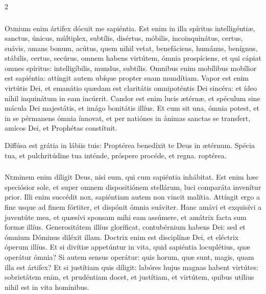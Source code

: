\documentclass[9pt,twoside]{extarticle}
\begin{document}
\begin{multicols}{2}
\subsubsection*{\center {}}
\lettrine{O}mnium enim ártifex dócuit me sapiéntia. Est enim in illa spíritus intelligéntiæ, sanctus, únicus, múltiplex, subtílis, disértus, móbilis, incoinquinátus, certus, suávis, amans bonum, acútus, quem nihil vetat, benefáciens, humánus, benígnus, stábilis, certus, secúrus, omnem habens virtútem, ómnia prospíciens, et qui cápiat omnes spíritus: intelligíbilis, mundus, subtílis. Omnibus enim mobílibus mobílior est sapiéntia: attíngit autem ubíque propter suam mundítiam. Vapor est enim virtútis Dei, et emanátio quædam est claritátis omnipoténtis Dei sincéra: et ídeo nihil inquinátum in eam incúrrit. Candor est enim lucis ætérnæ, et spéculum sine mácula Dei majestátis, et imágo bonitátis illíus. Et cum sit una, ómnia potest, et in se pérmanens ómnia ínnovat, et per natiónes in ánimas sanctas se transfert, amícos Dei, et Prophétas constítuit.

\begin{tightlist}{}
\item {} Diffúsa est grátia in lábiis tuis: \textred{*} Proptérea benedíxit te Deus in ætérnum.  Spécia tua, et pulchritúdine tua inténde, próspere procéde, et regna. roptérea.
\end{tightlist}

\subsubsection*{\center {}}
\lettrine{N}eminem enim díligit Deus, nisi eum, qui cum sapiéntia inhábitat. Est enim hæc speciósior sole, et super omnem dispositiónem stellárum, luci comparáta invenítur prior. Illi enim succédit nox, sapiéntiam autem non vincit malítia. Attíngit ergo a fine usque ad finem fórtiter, et dispónit ómnia suáviter. Hanc amávi et exquisívi a juventúte mea, et quæsívi sponsam mihi eam assúmere, et amátrix facta sum formæ illíus. Generositátem illíus gloríficat, contubérnium habens Dei: sed et ómnium Dóminus diléxit illam. Doctrix enim est disciplínæ Dei, et eléctrix óperum illíus. Et si divítiæ appetúntur in vita, quid sapiéntia locuplétius, quæ operátur ómnia? Si autem sensus operátur: quis horum, quæ sunt, magis, quam illa est ártifex? Et si justítiam quis díligit: labóres hujus magnas habent virtútes: sobrietátem enim, et prudéntiam docet, et justítiam, et virtútem, quibus utílius nihil est in vita homínibus.


\end{multicols}
\end{document}

